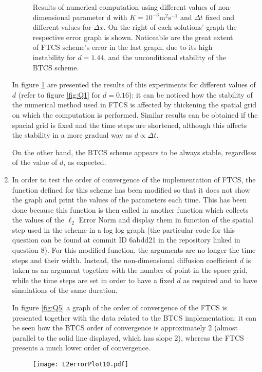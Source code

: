 \documentclass[12pt]{article}
\begin{document}
\begin{enumerate}
\begin{figure}[!tbh]
\caption{Results of numerical computation using different values of non-dimensional parameter d with $K=10^{-3}\text{m}^{2}\text{s}^{-1}$ and $\Delta t$ fixed and different values for $\Delta x$. On the right of each solutions' graph the respective error graph is shown. Noticeable are the great extent of FTCS scheme's error in the last graph, due to its high instability for $d=1.44$, and the unconditional stability of the BTCS scheme.
\label{fig:Q4}}
\end{figure}

In figure \ref{fig:Q4} are presented the results of this experiments for different values of $d$ (refer to figure \ref{fig:Q1} for $d=0.16$): it can be noticed how the stability of the numerical method used in FTCS is affected by thickening the spatial grid on which the computation is performed. Similar results can be obtained if the spacial grid is fixed and the time steps are shortened, although this affects the stability in a more gradual way as $d\propto \Delta t$. \par
On the other hand, the BTCS scheme appears to be always stable, regardless of the value of $d$, as expected.

\item In order to test the order of convergence of the implementation of FTCS, the function defined for this scheme has been modified so that it does not show the graph and print the values of the parameters each time. This has been done because this function is then called in another function which collects the values of the $\ell_2$ Error Norm and display them in function of the spatial step used in the scheme in a log-log graph (the particular code for this question can be found at commit ID 6abdd21 in the repository linked in question 8).
For this modified function, the arguments are no longer the time steps and their width. Instead, the non-dimensional diffusion coefficient $d$ is taken as an argument together with the number of point in the space grid, while the time steps are set in order to have a fixed $d$ as required and to have simulations of the same duration.\par
In figure \ref{fig:Q5} a graph of the order of convergence of the FTCS is presented together with the data related to the BTCS implementation: it can be seen how the BTCS order of convergence is approximately 2 (almost parallel to the solid line displayed, which has slope 2), whereas the FTCS presents a much lower order of convergence.

\begin{figure}[!tbh]
\centering
\texttt{[image: L2errorPlot10.pdf]}


\end{figure}
\end{enumerate}
\end{document}
